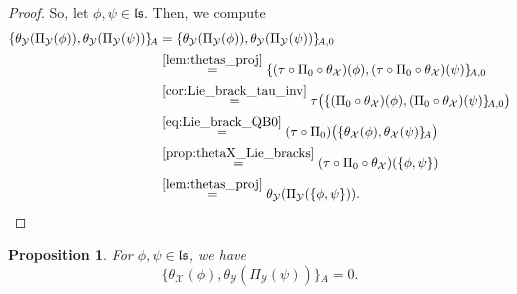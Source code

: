 \documentclass[12pt,reqno]{amsart}
\newtheorem{prop}[thm]{Proposition}
\numberwithin{equation}{section}
\theoremstyle{definition}
\newcommand{\X}{\mathcal{X}}
\newcommand{\Y}{\mathcal{Y}}
\newcommand{\ls}{\mathfrak{ls}}
\newcommand{\ari}[2]{\{#1,#2\}\!_A}
\newcommand{\arizero}[2]{\{#1,#2\}\!_{A,0}}
\newcommand{\pizero}{\Pi_0}
\newcommand{\piY}{\Pi_\Y}
\newcommand{\thetaX}{\theta_\X}
\newcommand{\thetaY}{\theta_\Y}
\begin{document}
\begin{proof}
So, let $\phi,\psi\in\ls$. Then, we compute
\begin{align*}
\ari{\thetaY(\piY(\phi))}{\thetaY(\piY(\psi))}&=\arizero{\thetaY(\piY(\phi))}{\thetaY(\piY(\psi))} \\
&\overset{\ref{lem:thetas_proj}}{=}\arizero{(\tau\circ\pizero\circ\thetaX)(\phi)}{(\tau\circ\pizero\circ\thetaX)(\psi)} \\
&\overset{\ref{cor:Lie_brack_tau_inv}}{=}\tau\big(\arizero{(\pizero\circ\thetaX)(\phi)}{(\pizero\circ\thetaX)(\psi)} \big) \\
&\overset{\ref{eq:Lie_brack_QB0}}{=} (\tau\circ \pizero)\big(\ari{\thetaX(\phi)}{\thetaX(\psi)} \big) \\
&\overset{\ref{prop:thetaX_Lie_bracks}}{=}(\tau\circ \pizero\circ \thetaX)(\{\phi,\psi\}) \\
&\overset{\ref{lem:thetas_proj}}{=} \thetaY(\piY(\{\phi,\psi\})).
\qedhere\end{align*}
\end{proof}

\begin{prop} \label{prop:thetaXY_ari}For $\phi,\psi\in\ls$, we have
\[\ari{\thetaX(\phi)}{\thetaY(\piY(\psi))}=0.\] 
\end{prop}
\end{document}
